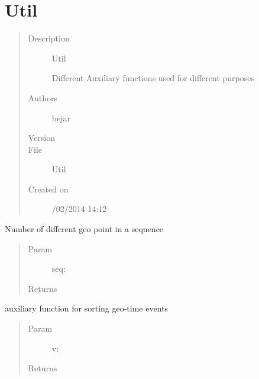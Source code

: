 \documentclass[letterpaper,10pt,english]{sphinxmanual}
\begin{document}
\section{Util}
\label{index:util}\begin{quote}\begin{description}
\item[{Description}] \leavevmode
Util

Different Auxiliary functions used for different purposes

\item[{Authors}] \leavevmode
bejar

\item[{Version}] 

\item[{File}] \leavevmode
Util

\item[{Created on}] /02/2014 14:12

\end{description}\end{quote}

\begin{fulllineitems}
\label{index:SuperHub.Util.diff_items}
Number of different geo point in a sequence
\begin{quote}\begin{description}
\item[{Param }] \leavevmode
seq:

\item[{Returns}] \leavevmode


\end{description}\end{quote}

\end{fulllineitems}


\begin{fulllineitems}
\label{index:SuperHub.Util.item_key_sort}
auxiliary function for sorting geo-time events
\begin{quote}\begin{description}
\item[{Param }] \leavevmode
v:

\item[{Returns}] \leavevmode


\end{description}\end{quote}

\end{fulllineitems}
\end{document}
